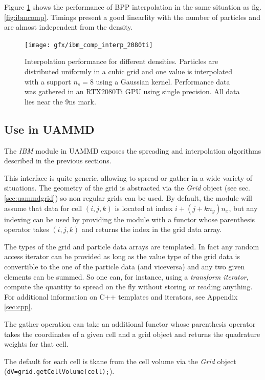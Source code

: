 \documentclass[ twoside,openright,titlepage,numbers=noenddot,%
headinclude,footinclude,cleardoublepage=empty,abstract=on,
BCOR=5mm,paper=a4,fontsize=11pt, dvipsnames
]{scrreprt}
\def\ucpp{uammd_cpp_lexer.py:UAMMDCppLexer -x}
\newcommand{\uammd}{\gls{UAMMD}\xspace}
\newcommand{\gpu}{\gls{GPU}\xspace}
\begin{document}
Figure \ref{fig:ibmcompinterp} shows the performance of BPP interpolation in the same situation as fig. \ref{fig:ibmcomp}. Timings present a good linearlity with the number of particles and are almost independent from the density. 
\begin{figure}[h]
  \centering
\texttt{[image: gfx/ibm\_comp\_interp\_2080ti]}
\caption{Interpolation performance for different densities. Particles are distributed uniformly in a cubic grid and one value is interpolated with a support $n_s=8$ using a Gaussian kernel. Performance data was gathered in an RTX2080Ti \gpu using single precision. All data lies near the 9ns mark.}
  \label{fig:ibmcompinterp}
\end{figure}

\subsection*{Use in UAMMD}

The \emph{IBM} module in \uammd exposes the spreading and interpolation algorithms described in the previous sections.

This interface is quite generic, allowing to spread or gather in a wide variety of situations. The geometry of the grid is abstracted via the \emph{Grid} object (see sec. \ref{sec:uammdgrid}) so non regular grids can be used. By default, the module will assume that data for cell $(i,j,k)$ is located at index $i+(j+kn_y)n_x$, but any indexing can be used by providing the module with a functor whose parenthesis operator takes $(i,j,k)$ and returns the index in the grid data array.

The types of the grid and particle data arrays are templated. In fact any random access iterator can be provided as long as the value type of the grid data is convertible to the one of the particle data (and viceversa) and any two given elements can be summed. So one can, for instance, using a \emph{transform iterator},  compute the quantity to spread on the fly without storing or reading anything. For additional information on C++ templates and iterators, see Appendix \ref{sec:cpp}.

The gather operation can take an additional functor whose parenthesis operator takes the coordinates of a given cell and a grid object and returns the quadrature weights for that cell.

The default for each cell is tkane from the cell volume via the \emph{Grid} object (\texttt{dV=grid.getCellVolume(cell);}).
\end{document}
